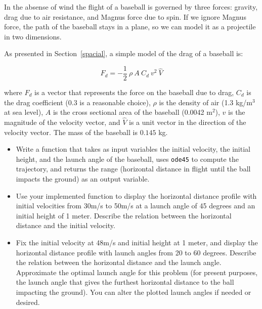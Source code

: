 \documentclass{book}
\newcommand{\uvec}[1]{\hat{#1}}
\begin{document}
\begin{ex}
\label{baseball}

In the absense of wind the flight of a baseball is governed by three forces: gravity,
drag due to air resistance, and Magnus force due to spin.  If
we ignore Magnus force, the path of the baseball stays
in a plane, so we can model it as a projectile in two
dimensions.

As presented in Section~\ref{spacial}, a
simple model of the drag of a baseball is:

\begin{equation}
F_d = -\frac{1}{2} ~ \rho ~ A ~ C_d ~ v^2 ~ \uvec{V}
\end{equation}


where $F_d$ is a vector that represents the force on the baseball due
to drag, $C_d$ is the drag coefficient (0.3 is a reasonable choice),
$\rho$ is the density of air (1.3 kg/m$^3$ at sea level), $A$ is the
cross sectional area of the baseball (0.0042 m$^2$), $v$ is the
magnitude of the velocity vector, and $\uvec{V}$ is a unit vector in
the direction of the velocity vector.  The mass of the baseball is
$0.145$ kg.

\begin{itemize}

\item Write a function that takes
as input variables
the initial velocity, the initial height, and the launch angle of the baseball,
uses {\tt ode45} to compute
the trajectory, and returns the range (horizontal distance in flight until
the ball impacts the ground)
as an output variable.

\item Use your implemented function to display the horizontal distance profile
with initial velocities from 30m/s to 50m/s at a launch angle of 45 degrees
and an initial height of 1 meter.
Describe the relation between the horizontal distance and the initial velocity.

\item Fix the initial velocity at 48m/s and initial height at 1 meter, and display
the horizontal distance profile
with launch angles from 20 to 60 degrees. Describe the relation between
the horizontal distance and the launch angle.  Approximate the optimal
launch angle for this problem (for present purposes, the launch angle that gives the furthest horizontal distance to the ball impacting the ground).
You can alter the plotted launch angles if needed or desired.

\end{itemize}

\end{ex}
\end{document}

